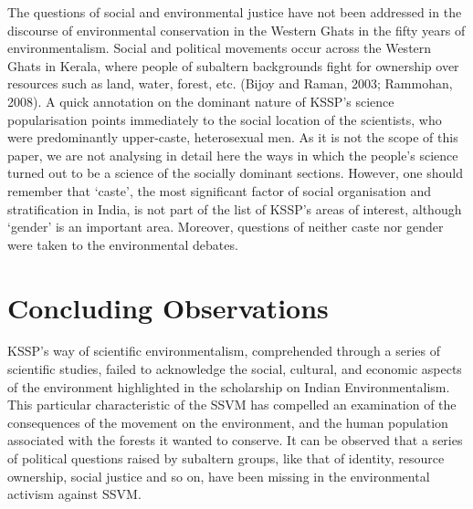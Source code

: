 \documentclass[twoside, 13pt]{article}
\begin{document}
{{{{{\fontsize{12}{14}\selectfont The questions of social and environmental justice have not been addressed in the discourse of environmental conservation in the Western Ghats in the fifty years of environmentalism. Social and political movements occur across the Western Ghats in Kerala, where people of subaltern backgrounds fight for ownership over resources such as land, water, forest, etc. (Bijoy and Raman, 2003; Rammohan, 2008). A quick annotation on the dominant nature of KSSP’s science popularisation points immediately to the social location of the scientists, who were predominantly upper-caste, heterosexual men. As it is not the scope of this paper, we are not analysing in detail here the ways in which the people’s science turned out to be a science of the socially dominant sections. However, one should remember that ‘caste’, the most significant factor of social organisation and stratification in India, is not part of the list of KSSP’s areas of interest, although ‘gender’ is an important area. Moreover, questions of neither caste nor gender were taken to the environmental debates. }


\vspace{-.6cm}

{\fontsize{18}{20}\selectfont\section*{Concluding Observations}}

\vspace{-.2cm}

{\fontsize{12}{14}\selectfont KSSP’s way of scientific environmentalism, comprehended through a series of scientific studies, failed to acknowledge the social, cultural, and economic aspects of the environment highlighted in the scholarship on Indian Environmentalism. This particular characteristic of the SSVM has compelled an examination of the consequences of the movement on the environment, and the human population associated with the forests it wanted to conserve. It can be observed that a series of political questions raised by subaltern groups, like that of identity, resource ownership, social justice and so on, have been missing in the environmental activism against SSVM. 

}}}}}
\end{document}
